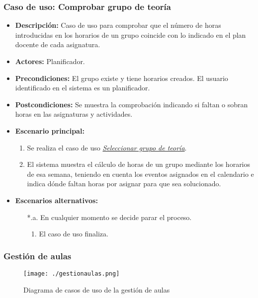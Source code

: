 \subsubsection*{Caso de uso: Comprobar grupo de teoría}
\begin{itemize}
\item{\bf Descripción:} Caso de uso para comprobar que el número de horas introducidas en los horarios de un grupo coincide con lo indicado en el plan docente de cada asignatura.
\item{\bf Actores:} Planificador.
\item{\bf Precondiciones:} El grupo existe y tiene horarios creados. El usuario identificado en el sistema es un planificador.
\item{\bf Postcondiciones:} Se muestra la comprobación indicando si faltan o sobran horas en las asignaturas y actividades.
\item{\bf Escenario principal:}
	\begin{enumerate}
	\item Se realiza el caso de uso {\em \hyperref[select_grupo]{Seleccionar grupo de teoría}}.
	\item El sistema muestra el cálculo de horas de un grupo mediante los horarios de esa semana, teniendo en cuenta los eventos asignados en el calendario e indica dónde faltan horas por asignar para que sea solucionado.
	\end{enumerate}
\item{\bf Escenarios alternativos:}
	\begin{itemize}
		\item[*.a.] En cualquier momento se decide parar el proceso.
		\begin{enumerate}
			\item El caso de uso finaliza.
		\end{enumerate}
	\end{itemize}
\end{itemize}



\subsubsection{Gestión de aulas}
\begin{figure}[H] 
  \label{gestion-aulas} 
	\begin{center}
    \texttt{[image: ./gestionaulas.png]}
  \end{center}
\caption{Diagrama de casos de uso de la gestión de aulas}
\end{figure}
